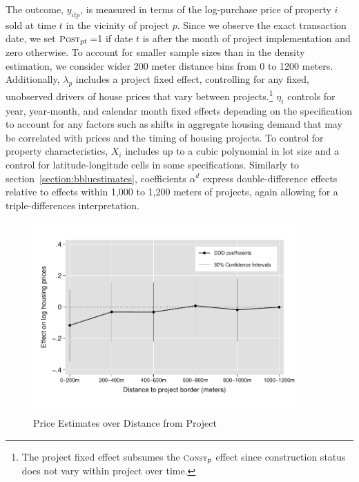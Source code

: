 \documentclass[12pt]{article}
\begin{document}
\noindent The outcome, $y_{itp}$, is measured in terms of the log-purchase price of property $i$ sold at time $t$ in the vicinity of project $p$.  Since we observe the exact transaction date, we set $\textsc{\small Post}_{pt}$\,=1 if date $t$ is after the month of project implementation and zero otherwise.  To account for smaller sample sizes than in the density estimation, we consider wider 200 meter distance bins from 0 to 1200 meters.  Additionally, $\lambda_p$ includes a project fixed effect, controlling for any fixed, unobserved drivers of house prices that vary between projects.\footnote{The project fixed effect subsumes the $\textsc{\footnotesize Const}_{p}$ effect since construction status does not vary within project over time.}  $\eta_{t}$ controls for year, year-month, and calendar month fixed effects depending on the specification to account for any factors such as shifts in aggregate housing demand that may be correlated with prices and the timing of housing projects.  To control for property characteristics, $X_i$ includes up to a cubic polynomial in lot size and a control for latitude-longitude cells in some specifications. Similarly to section~\ref{section:bbluestimates}, coefficients $\alpha^d$ express double-difference effects relative to effects within 1,000 to 1,200 meters of projects, again allowing for a triple-differences interpretation.  

\begin{figure}[b!]
\caption{Price Estimates over Distance from Project}\label{figure:distplot}
\centering
\includegraphics[width=0.9\textwidth,trim={0cm .7cm 0cm 0.7cm},clip=true]{figures/price_regs_DDDplot}
\vspace{-2mm}
\end{figure}
\end{document}
